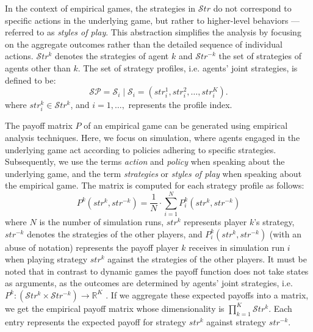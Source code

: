         \noindent
        In the context of empirical games, the strategies in $\mathcal{S}tr$ do not correspond to specific actions in the underlying game, but rather to higher-level behaviors —referred to as \emph{styles of play}. This abstraction simplifies the analysis by focusing on the aggregate outcomes rather than the detailed sequence of individual actions. $\mathcal{S}tr^k$ denotes the strategies of agent $k$ and $\mathcal{S}tr^{-k}$ the set of strategies of agents other than $k$. The set of strategy profiles, i.e. agents' joint strategies, is defined to be:
        \begin{equation}
            \mathcal{SP} = \mathcal{S}_i \mid \mathcal{S}_i = (str_i^1, str_i^2, \dots, str_i^K).
            \label{eq:strategy_profiles}
        \end{equation}
        where $str_i^k \in \mathcal{S}tr^k$, and $i = 1, \dots,$ represents the profile index.\tinydouble
        
        \noindent
        The payoff matrix $P$ of an empirical game can be generated using empirical analysis techniques. Here, we focus on simulation, where agents engaged in the underlying game act according to policies adhering to specific strategies. Subsequently, we use the terms \emph{action} and \emph{policy} when speaking about the underlying game, and the term \emph{strategies} or \emph{styles of play} when speaking about the empirical game. The matrix is computed for each strategy profile as follows:
        \begin{equation}
            P^k(str^k, str^{-k}) =\frac{1}{N} \cdot \sum_{i=1}^{N} P^k_{i}(str^k, str^{-k})
            \label{eq:meta_payoff}
        \end{equation}
        where $N$ is the number of simulation runs, $str^k$ represents player $k$'s strategy, $str^{-k}$ denotes the strategies of the other players, and $P^k_{i}(str^k, str^{-k})$ (with an abuse of notation) represents the payoff player $k$ receives in simulation run $i$ when playing strategy $str^k$ against the strategies of the other players. It must be noted that in contrast to dynamic games the payoff function does not take states as arguments, as the outcomes are determined by agents' joint strategies, i.e. $P^k: (\mathcal{S}tr^k \times \mathcal{S}tr^{-k}) \to \mathbb{R}^K$ \cite{omidshafiei2019alpharank}. If we aggregate these expected payoffs into a matrix, we get the empirical payoff matrix whose dimensionality is $\prod_{k=1}^K\mathcal{S}tr^k$. Each entry represents the expected payoff for strategy $str^k$ against strategy $str^{-k}$.
